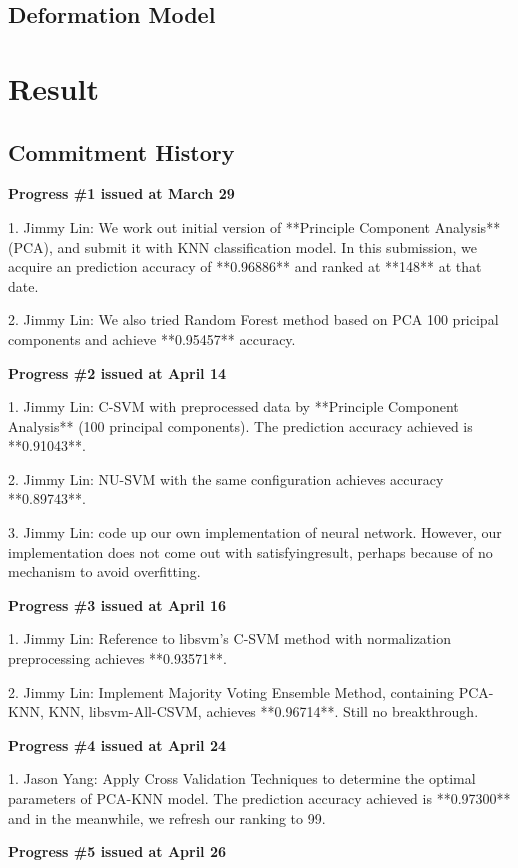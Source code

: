 \documentclass{article} %
\begin{document}
\subsection{Deformation Model}

\section{Result} \label{Comparison}

\subsection{Commitment History}
{\bf Progress \#1 issued at March 29 }

1. Jimmy Lin: We work out initial version of **Principle Component Analysis**(PCA), and
submit it with KNN classification model. In this submission, we acquire an
prediction accuracy of **0.96886** and ranked at **148** at that date. 

2. Jimmy Lin: We also tried Random Forest method based on PCA 100 pricipal components and
achieve **0.95457** accuracy.

{\bf Progress \#2 issued at April 14 }

1. Jimmy Lin: C-SVM with preprocessed data by **Principle Component Analysis** (100
principal components). The prediction accuracy achieved is **0.91043**.

2. Jimmy Lin: NU-SVM with the same configuration achieves accuracy **0.89743**.

3. Jimmy Lin: code up our own implementation of neural network. However,
our implementation does not come out with satisfyingresult, perhaps because of
no mechanism to avoid overfitting.  

{\bf Progress \#3 issued at April 16 }

1. Jimmy Lin: Reference to libsvm's C-SVM method with normalization preprocessing achieves **0.93571**.

2. Jimmy Lin: Implement Majority Voting Ensemble Method, containing PCA-KNN, KNN, libsvm-All-CSVM,
achieves **0.96714**. Still no breakthrough.

{\bf Progress \#4 issued at April 24 }

1. Jason Yang: Apply Cross Validation Techniques to determine the optimal parameters of
PCA-KNN model. The prediction accuracy achieved is **0.97300** and in the
meanwhile, we refresh our ranking to 99.


{\bf Progress \#5 issued at April 26 }
\end{document}
